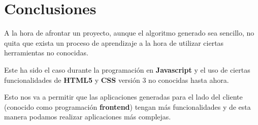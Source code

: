 \documentclass{\ClassPath/viu-tfm-template}
\begin{document}
\chapter{Conclusiones}

A la hora de afrontar un proyecto, aunque el algoritmo generado sea sencillo, no quita que exista un proceso de aprendizaje a la hora de utilizar ciertas herramientas no conocidas.

Este ha sido el caso durante la programación en \textbf{Javascript} y el uso de ciertas funcionalidades de \textbf{HTML5} y \textbf{CSS} versión 3 no conocidas hasta ahora.

Esto nos va a permitir que las aplicaciones generadas para el lado del cliente (conocido como programación \textbf{frontend}) tengan más funcionalidades y de esta manera podamos realizar aplicaciones más complejas.


\end{document}
